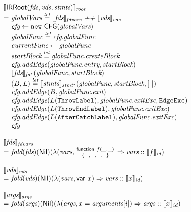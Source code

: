 \[
\begin{array}{l@{}l@{~}l}
\lefteqn{\transfun{\IRRoot(\emph{fds}, \emph{vds}, \emph{stmts})}_{\emph{root}}}\\
& = & \emph{globalVars} \letval \transfun{\emph{fds}}_{\emph{fdvars}} ~\emph{++}~ \transfun{\emph{vds}}_{\emph{vds}} \\
& & \emph{cfg} \leftarrow \new\ \CFG(\emph{globalVars})\\
& & \emph{globalFunc} \letval \emph{cfg}.\emph{globalFunc}\\
& & \emph{currentFunc} \leftarrow \emph{globalFunc}\\
& & \emph{startBlock} \letval \emph{globalFunc}.\emph{createBlock}\\
& & \emph{cfg}.\emph{addEdge}(\emph{globalFunc}.\emph{entry}, \emph{startBlock})\\
& & \transfun{\emph{fds}}_{\emph{fd}^*}(\emph{globalFunc}, \emph{startBlock})\\
& & (B, L) \letval \transfun{\emph{stmts}}_{\emph{stmt}^{*}}(\emph{globalFunc}, \emph{startBlock}, [\ ])\\
& & \emph{cfg}.\emph{addEdge}(B, \emph{globalFunc}.\emph{exit})\\
& & \emph{cfg}.\emph{addEdge}(L(\TT{ThrowLabel}), \emph{globalFunc}.\emph{exitExc}, \EdgeExc)\\
& & \emph{cfg}.\emph{addEdge}(L(\TT{ThrowEndLabel}), \emph{globalFunc}.\emph{exitExc})\\
& & \emph{cfg}.\emph{addEdge}(L(\TT{AfterCatchLabel}), \emph{globalFunc}.\emph{exitExc})\\
& & \emph{cfg}\\
& & \\
\lefteqn{\transfun{\emph{fds}}_{\emph{fdvars}}}\\
 & = &
\fold(\emph{fds})(\Nil)(\lambda(\emph{vars}, \irfundeclsmall{f}{\_}{\_}{\_}{\_}{\_}{\_} \Rightarrow \emph{vars} :: \transfun{f}_{\emph{id}})\\
& & \\

\lefteqn{\transfun{\emph{vds}}_{\emph{vds}}}\\
 & = &
\fold(\emph{vds})(\Nil)(\lambda(\emph{vars}, \irvar{x})\Rightarrow \emph{vars} :: \transfun{x}_{\emph{id}})\\
& & \\

\lefteqn{\transfun{\emph{args}}_{\emph{args}}}\\
 & = &
\fold(\emph{args})(\Nil)(\lambda(\emph{args}, x = \emph{arguments}[i]) \Rightarrow \emph{args} :: \transfun{x}_{\emph{id}})\\
& & \\
\end{array}
\]

